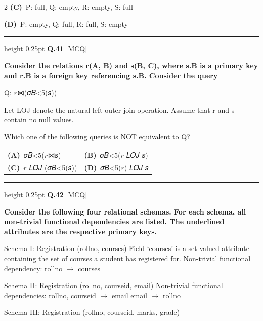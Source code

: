 \documentclass[a4paper,10pt,twoside]{article}
\begin{document}
\begin{multicols}{2}
\textbf{(C)}~P: full, Q: empty, R: empty, S: full\par\vspace{2pt}\noindent
\textbf{(D)}~P: empty, Q: full, R: full, S: empty
\par\vspace{6pt}\hrule height 0.25pt\vspace{6pt}
\noindent\textbf{Q.41} \hfill {\footnotesize\textsf{[MCQ]}}
\par\vspace{2pt}
{\bfseries Consider the relations r(A, B) and s(B, C), where s.B is a primary key and r.B is a foreign
key referencing s.B. Consider the query
\par\smallskip
Q: $r$⋈(𝜎𝐵<5(𝑠))
\par\smallskip
Let LOJ denote the natural left outer-join operation. Assume that r and s contain no null
values.
\par\smallskip
Which one of the following queries is NOT equivalent to Q? \par}
\par\vspace{2pt}\noindent
\begin{tabular*}{\columnwidth}{@{\extracolsep{\fill}}p{}p{}@{}}
\textbf{(A)}~𝜎𝐵<5($r$⋈𝑠) & \textbf{(B)}~𝜎𝐵<5($r$ 𝐿𝑂𝐽 𝑠) \\
\addlinespace[2pt]
\textbf{(C)}~$r$ 𝐿𝑂𝐽 (𝜎𝐵<5(𝑠)) & \textbf{(D)}~𝜎𝐵<5($r$) 𝐿𝑂𝐽 𝑠
\end{tabular*}
\par\vspace{6pt}\hrule height 0.25pt\vspace{6pt}
\noindent\textbf{Q.42} \hfill {\footnotesize\textsf{[MCQ]}}
\par\vspace{2pt}
{\bfseries Consider the following four relational schemas. For each schema, all non-trivial functional
dependencies are listed. The underlined attributes are the respective primary keys.
\par\smallskip
Schema I: Registration (rollno, courses)
Field `courses' is a set-valued attribute containing the set of courses a student has
registered for.
Non-trivial functional dependency:
rollno $\to$ courses
\par\smallskip
Schema II: Registration (rollno, courseid, email)
Non-trivial functional dependencies:
rollno, courseid $\to$ email
email $\to$ rollno
\par\smallskip
Schema III: Registration (rollno, courseid, marks, grade)
}
\end{multicols}
\end{document}
